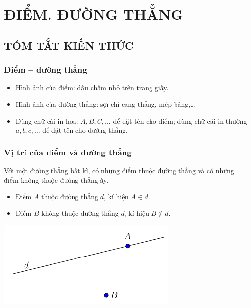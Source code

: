 \section{ĐIỂM. ĐƯỜNG THẲNG}
\subsection{TÓM TẮT KIẾN THỨC}
\begin{tomtat}
	\subsubsection{Điểm – đường thẳng}
\begin{itemize}
\item Hình ảnh của điểm: dấu chấm nhỏ trên trang giấy.
\item Hình ảnh của đường thẳng: sợi chỉ căng thẳng, mép bảng,…
\item Dùng chữ cái in hoa: $A, B, C,\dots$ để đặt tên cho điểm; dùng chữ cái in thường $a, b, c,\dots$ để đặt tên cho đường thẳng.
\end{itemize}
	\subsubsection{Vị trí của điểm và đường thẳng} 
	Với một đường thẳng bất kì, có những điểm thuộc đường thẳng  và có những điểm không thuộc đường thẳng ấy.
\begin{itemize}
\item Điểm $A$ thuộc đường thẳng $d$, kí hiệu $A \in d$.
\item Điểm $B$ không thuộc đường thẳng $d$, kí hiệu $B \notin d$.
\end{itemize}
\begin{center}
\includegraphics[scale=0.7]{img/bai1_h1}
\end{center}
\end{tomtat}

